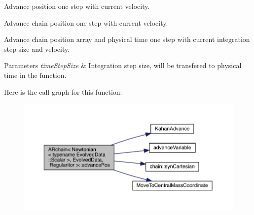 Advance position one step with current velocity. 

Advance chain position one step with current velocity.

Advance chain position array and physical time one step with current integration step size and velocity. 
\begin{DoxyParams}{Parameters}
{\em time\+Step\+Size} & Integration step size, will be transfered to physical time in the function. \\
\hline
\end{DoxyParams}
Here is the call graph for this function\+:\nopagebreak
\begin{figure}[H]
\begin{center}
\leavevmode
\includegraphics[width=350pt]{class_a_rchain_3_01_newtonian_3_01typename_01_evolved_data_1_1_scalar_01_4_00_01_evolved_data_00_01_regularitor_01_4_adffd5a74134d2a87e4f07908ea5beef4_cgraph}
\end{center}
\end{figure}
\mbox{\label{class_a_rchain_3_01_newtonian_3_01typename_01_evolved_data_1_1_scalar_01_4_00_01_evolved_data_00_01_regularitor_01_4_ad11d21617228157e755aa334d9c621a7}} 

